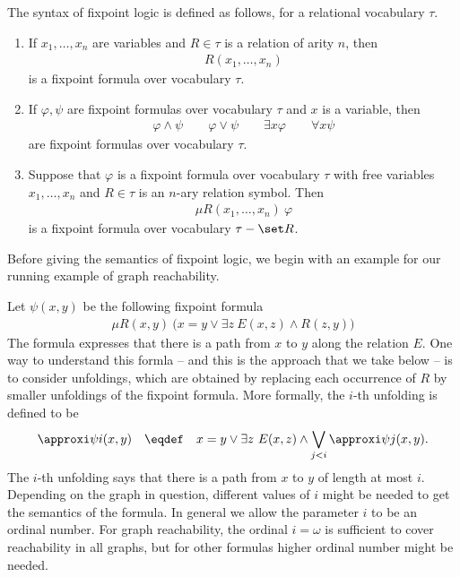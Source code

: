\begin{definition} The syntax of fixpoint logic is defined as follows, for a relational vocabulary $\tau$. 
 \begin{enumerate}
 \item \label{it:fixpoint-relation} If $x_1,\ldots,x_n$ are variables and $R \in \tau$ is a relation of arity $n$, then
 \begin{align*}
 R(x_1,\ldots,x_n)
 \end{align*}
 is a fixpoint formula over vocabulary $\tau$.
 \item \label{it:fixpoint-connectives} If $\varphi,\psi$ are fixpoint formulas over vocabulary $\tau$ and $x$ is a variable, then
 \begin{align*}
 \varphi \land \psi \qquad \varphi \lor \psi \qquad \exists x \varphi \qquad \forall x \psi
 \end{align*}
 are fixpoint formulas over vocabulary $\tau$. 
 \item \label{it:fixpoint-fixpoint} Suppose that $\varphi$ is a fixpoint formula over vocabulary $\tau$ with free variables $x_1,\ldots,x_n$ and $R \in \tau$ is an $n$-ary relation symbol. Then
 \begin{align*}
 \mu R(x_1,\ldots,x_n) \ \varphi 
 \end{align*}
 is a fixpoint formula over vocabulary $\tau - \set R$. 
 \end{enumerate}
\end{definition}
Before giving the semantics of fixpoint logic, we begin with an example for our running example of graph reachability.
\begin{myexample}
 Let $\psi(x,y)$ be the following fixpoint formula
 \begin{align*}
 \mu R(x,y) \ \big(x=y \lor \exists z\ E(x,z) \land R(z,y)\big)
 \end{align*}
 The formula expresses that there is a path from $x$ to $y$ along the relation $E$. One way to understand this formla -- and this is the approach that we take below -- is to consider unfoldings, which are obtained by replacing each occurrence of $R$ by smaller unfoldings of the fixpoint formula. More formally, the $i$-th unfolding is defined to be 
 \begin{align*}
 \approxi \psi i (x,y) \quad \eqdef \quad x= y \lor \exists z\ E(x,z) \land \bigvee_{j < i} \approxi \psi j (x,y).
 \end{align*}
 The $i$-th unfolding says that there is a path from $x$ to $y$ of length at most $i$. Depending on the graph in question, different values of $i$ might be needed to get the semantics of the formula. In general we allow the parameter $i$ to be an ordinal number. For graph reachability, the ordinal $i=\omega$ is sufficient to cover reachability in all graphs, but for other formulas higher ordinal number might be needed. 
\end{myexample}

